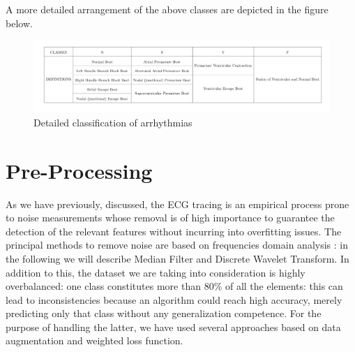 \documentclass[LaM,binding=0.6cm]{sapthesis}
\begin{document}
A more detailed arrangement of the above classes are depicted in the figure below.
\begin{figure}   \centering
    \includegraphics[width=150mm,scale=0.7]{allclass}
    \caption{Detailed classification of arrhythmias }
    \label{fig:allclass}
\end{figure}

\chapter{Pre-Processing}
As we have previously, discussed, the ECG tracing is an empirical process prone to noise measurements whose removal is of high importance to guarantee the detection of the relevant features without incurring into overfitting issues. The principal methods to remove noise are based on frequencies domain analysis : in the following we will describe Median Filter and Discrete Wavelet Transform. In addition to this, the dataset we are taking into consideration is highly overbalanced: one class constitutes more than 80\% of all the elements: this can lead to inconsistencies because an algorithm could reach high accuracy, merely predicting only that class without any generalization competence. For the purpose of handling the latter, we have used several approaches based on data augmentation and weighted loss function. 
\end{document}
